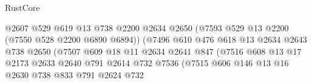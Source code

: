 \begin{lexlean}{RustCore}
\begin{coremodule}
                                              @2607
                                              @529
                                              @619
                                              @13
                                              @738
                                              @2200
                                              @2634
                                              @2650
                                              (@7593 @529 @13 @2200 (@7550 @528 @2200 @6890 @6894))
                                              (@7496
                                                @610
                                                @476
                                                @618
                                                @13
                                                @2634
                                                @2643
                                                @738
                                                @2650
                                                (@7507
                                                  @609
                                                  @18
                                                  @11
                                                  @2634
                                                  @2641
                                                  @847
                                                  (@7516
                                                    @608
                                                    @13
                                                    @17
                                                    @2173
                                                    @2633
                                                    @2640
                                                    @791
                                                    @2614
                                                    @732
                                                    @7536
                                                    (@7515
                                                      @606
                                                      @146
                                                      @13
                                                      @16
                                                      @2630
                                                      @738
                                                      @833
                                                      @791
                                                      @2624
                                                      @732

\end{coremodule}
\end{lexlean}

